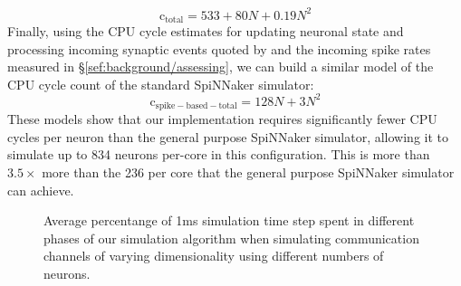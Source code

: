 \documentclass[conference]{IEEEtran}
\begin{document}
%
\begin{equation}
  \mathrm{c}_\mathrm{total} = 533 + 80 N + 0.19 N^{2}\label{eq:profiling_total_eliasmith}
\end{equation}
%
Finally, using the CPU cycle estimates for updating neuronal state and processing incoming synaptic events quoted by \textcite{Sharp2013} and the incoming spike rates measured in \S\ref{sef:background/assessing}, we can build a similar model of the CPU cycle count of the standard SpiNNaker simulator:
%
\begin{equation}
  \mathrm{c}_\mathrm{spike-based-total} = 128N + 3 N^{2}\label{eq:profiling_spike_based_total}
\end{equation}
% 
These models show that our implementation requires significantly fewer CPU cycles per neuron than the general purpose SpiNNaker simulator, allowing it to simulate up to 834 neurons per-core in this configuration. 
This is more than $3.5 \times$ more than the 236 per core that the general purpose SpiNNaker simulator can achieve.


  \begin{figure}[!t]
    \centering
    \hfil
    \caption{Average percentange of 1ms simulation time step spent in different phases of our simulation algorithm when simulating communication channels of varying dimensionality using different numbers of neurons.}
    \label{fig:results/comm-channel-cpu}
  \end{figure}
\end{document}
